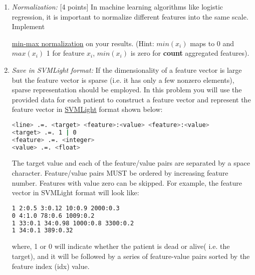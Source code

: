 \documentclass[12pt]{article}
\begin{document}
\begin{enumerate}
\begin{lstlisting}[frame=single]
(1, 1)
(0, 1)
(2, 2)
(3, 4)
\end{lstlisting}

\iffalse
\item \emph{Imputation:} [10 points]
Physicians order lab tests for patient on demand, thus we don't have average lab value as feature if patient don't have such test. This is a missing value problem. For a given feature, if its value is not missing from a few patients(more than 10 patients here in this problem), one can use average value of non-missing to replace missing, this is called the \href{http://missingdata.lshtm.ac.uk/index.php?option=com_content&view=article&id=68:simple-mean-imputation&catid=39:simple-ad-hoc-methods-for-coping-with-missing-data&Itemid=96}{Simple Mean Imputation}.
\fi

\item \emph{Normalization:} [4 points] In machine learning algorithms like logistic regression, it is important to normalize different features into the same scale. Implement 
 
\href{http://stats.stackexchange.com/questions/70801/how-to-normalize-data-to-0-1-range}{min-max normalization} on your results. (Hint: $min(x_i)$ maps to 0 and $max(x_i)$ 1 for feature $x_i$, $min(x_i)$ is zero for \textbf{count} aggregated features).

\item \emph{Save in  SVMLight format:} If the dimensionality of a feature vector is large but the feature vector is sparse (i.e. it has only a few nonzero elements), sparse representation should be employed. In this problem you will use the provided data for each patient to construct a feature vector and represent the feature vector in \href{http://svmlight.joachims.org/}{SVMLight} format shown below: \\

\begin{lstlisting}[frame=single, language=bash]
<line> .=. <target> <feature>:<value> <feature>:<value> 
<target> .=. 1 | 0
<feature> .=. <integer>
<value> .=. <float>
\end{lstlisting}

The target value and each of the feature/value pairs are separated by a space character. Feature/value pairs MUST be ordered by increasing feature number. Features with value zero can be skipped. For example, the feature vector in SVMLight format will look like: \\

\begin{lstlisting}[frame=single, language=bash]
1 2:0.5 3:0.12 10:0.9 2000:0.3
0 4:1.0 78:0.6 1009:0.2
1 33:0.1 34:0.98 1000:0.8 3300:0.2
1 34:0.1 389:0.32 
\end{lstlisting}

where, 1 or 0 will indicate whether the patient is dead or alive( i.e. the target), and it will be followed by a series of feature-value pairs sorted by the feature index (idx) value. 
\newline
\end{enumerate}
\end{document}
